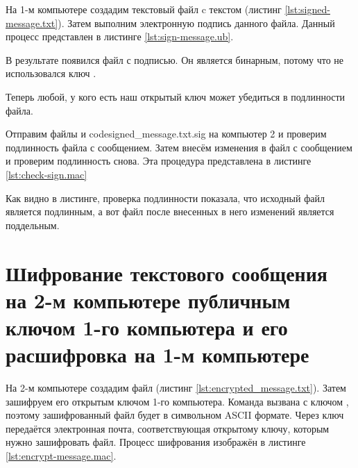 На 1-м компьютере создадим текстовый файл  c текстом  (листинг \ref{lst:signed-message.txt}). Затем выполним электронную подпись данного файла. Данный процесс представлен в листинге \ref{lst:sign-message.ub}.





В результате появился файл  с подписью. Он является бинарным, потому что не использовался ключ .

Теперь любой, у кого есть наш открытый ключ может убедиться в подлинности файла.

Отправим файлы  и code{signed\_message.txt.sig} на компьютер 2 и проверим подлинность файла с сообщением. Затем внесём изменения в файл с сообщением и проверим подлинность снова. Эта процедура представлена в листинге \ref{lst:check-sign.mac}



Как видно в листинге, проверка подлинности показала, что исходный файл является подлинным, а вот файл после внесенных в него изменений является поддельным.

\section{Шифрование текстового сообщения на 2-м компьютере публичным ключом 1-го компьютера и его расшифровка на 1-м компьютере}

На 2-м компьютере создадим файл  (листинг \ref{lst:encrypted_message.txt}). Затем зашифруем его открытым ключом 1-го компьютера. Команда вызвана с ключом , поэтому зашифрованный файл будет в символьном ASCII формате. Через ключ  передаётся электронная почта, соответствующая открытому ключу, которым нужно зашифровать файл. Процесс шифрования изображён в листинге \ref{lst:encrypt-message.mac}.

